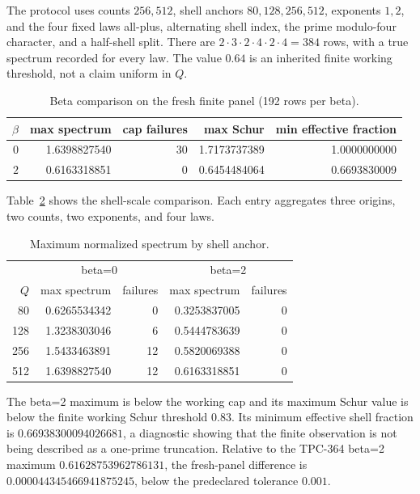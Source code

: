 \documentclass[10pt]{article}
\begin{document}
The protocol uses counts $256,512$, shell anchors $80,128,256,512$,
exponents $1,2$, and the four fixed laws all-plus, alternating shell index,
the prime modulo-four character, and a half-shell split.  There are
$2\cdot3\cdot2\cdot4\cdot2\cdot4=384$ rows, with a true spectrum recorded
for every law.  The value $0.64$ is an inherited finite working threshold,
not a claim uniform in $Q$.

\begin{table}[t]
\centering
\caption{Beta comparison on the fresh finite panel (192 rows per beta).}
\label{tab:beta}
\small
\begin{tabular}{r r r r r}
\toprule
$\beta$ & max spectrum & cap failures & max Schur & min effective fraction\\
\midrule
$0$ & 1.6398827540 & 30 & 1.7173737389 & 1.0000000000\\
$2$ & 0.6163318851 & 0 & 0.6454484064 & 0.6693830009\\
\bottomrule
\end{tabular}
\end{table}

Table~\ref{tab:q} shows the shell-scale comparison.  Each entry aggregates
three origins, two counts, two exponents, and four laws.

\begin{table}[t]
\centering
\caption{Maximum normalized spectrum by shell anchor.}
\label{tab:q}
\small
\begin{tabular}{r r r r r}
\toprule
 & \multicolumn{2}{c}{beta=0} & \multicolumn{2}{c}{beta=2}\\
$Q$ & max spectrum & failures & max spectrum & failures\\
\midrule
80  & 0.6265534342 & 0 & 0.3253837005 & 0\\
128 & 1.3238303046 & 6 & 0.5444783639 & 0\\
256 & 1.5433463891 & 12 & 0.5820069388 & 0\\
512 & 1.6398827540 & 12 & 0.6163318851 & 0\\
\bottomrule
\end{tabular}
\end{table}

The beta=2 maximum is below the working cap and its maximum Schur value is
below the finite working Schur threshold $0.83$.  Its minimum effective shell
fraction is $0.66938300094026681$, a diagnostic showing that the finite
observation is not being described as a one-prime truncation.  Relative to
the TPC-364 beta=2 maximum $0.61628753962786131$, the fresh-panel difference
is $0.000044345466941875245$, below the predeclared tolerance $0.001$.
\end{document}
